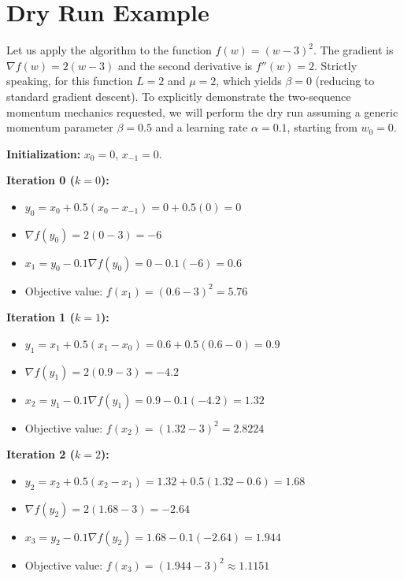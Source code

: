 \documentclass[11pt]{article}
\begin{document}
\section*{Dry Run Example}
Let us apply the algorithm to the function $f(w) = (w-3)^2$. 
The gradient is $\nabla f(w) = 2(w-3)$ and the second derivative is $f''(w) = 2$.
Strictly speaking, for this function $L = 2$ and $\mu = 2$, which yields $\beta = 0$ (reducing to standard gradient descent). To explicitly demonstrate the two-sequence momentum mechanics requested, we will perform the dry run assuming a generic momentum parameter $\beta = 0.5$ and a learning rate $\alpha = 0.1$, starting from $w_0 = 0$.

\textbf{Initialization:}
$x_0 = 0$, $x_{-1} = 0$.

\textbf{Iteration 0 ($k=0$):}
\begin{itemize}
    \item $y_0 = x_0 + 0.5(x_0 - x_{-1}) = 0 + 0.5(0) = 0$
    \item $\nabla f(y_0) = 2(0 - 3) = -6$
    \item $x_1 = y_0 - 0.1 \nabla f(y_0) = 0 - 0.1(-6) = 0.6$
    \item Objective value: $f(x_1) = (0.6 - 3)^2 = 5.76$
\end{itemize}

\textbf{Iteration 1 ($k=1$):}
\begin{itemize}
    \item $y_1 = x_1 + 0.5(x_1 - x_0) = 0.6 + 0.5(0.6 - 0) = 0.9$
    \item $\nabla f(y_1) = 2(0.9 - 3) = -4.2$
    \item $x_2 = y_1 - 0.1 \nabla f(y_1) = 0.9 - 0.1(-4.2) = 1.32$
    \item Objective value: $f(x_2) = (1.32 - 3)^2 = 2.8224$
\end{itemize}

\textbf{Iteration 2 ($k=2$):}
\begin{itemize}
    \item $y_2 = x_2 + 0.5(x_2 - x_1) = 1.32 + 0.5(1.32 - 0.6) = 1.68$
    \item $\nabla f(y_2) = 2(1.68 - 3) = -2.64$
    \item $x_3 = y_2 - 0.1 \nabla f(y_2) = 1.68 - 0.1(-2.64) = 1.944$
    \item Objective value: $f(x_3) = (1.944 - 3)^2 \approx 1.1151$
\end{itemize}
\end{document}
